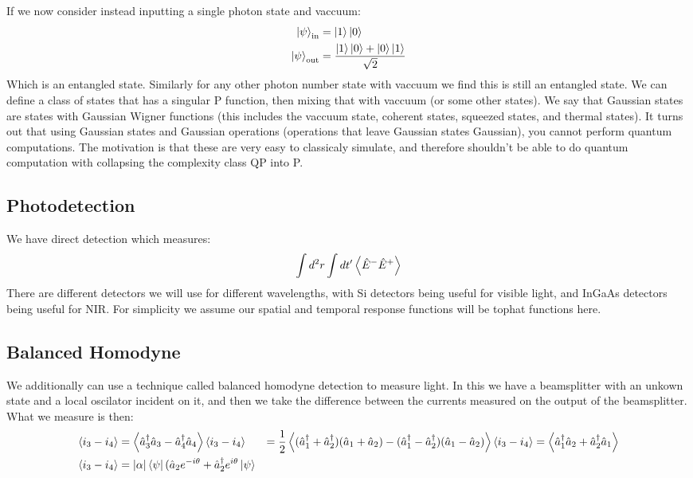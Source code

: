 If we now consider instead inputting a single photon state and vaccuum:
\begin{align*}
	\ket{\psi}_\text{in} &= \ket{1}\ket{0} \\
	\ket{\psi}_\text{out} &= \frac{\ket{1}\ket{0} + \ket{0}\ket{1}}{\sqrt{2}}
\end{align*}
Which is an entangled state. Similarly for any other photon number state with vaccuum we find this is still an entangled state.
We can define a class of states that has a singular P function, then mixing that with vaccuum (or some other states).
We say that Gaussian states are states with Gaussian Wigner functions (this includes the vaccuum state, coherent states, squeezed states, and thermal states).
It turns out that using Gaussian states and Gaussian operations (operations that leave Gaussian states Gaussian), you cannot perform quantum computations.
The motivation is that these are very easy to classicaly simulate, and therefore shouldn't be able to do quantum computation with collapsing the complexity class QP into P.

\subsection{Photodetection}
We have direct detection which measures:
\begin{align*}
	\int d^2 r \int dt' \expval{\hat{E}^-\hat{E}^+}
\end{align*}
There are different detectors we will use for different wavelengths, with Si detectors being useful for visible light, and InGaAs detectors being useful for NIR.
For simplicity we assume our spatial and temporal response functions will be tophat functions here.

\subsection{Balanced Homodyne}
We additionally can use a technique called balanced homodyne detection to measure light.
In this we have a beamsplitter with an unkown state and a local oscilator incident on it, and then we take the difference between the currents measured on the output of the beamsplitter. What we measure is then:
\begin{align*}
	\expval{i_3  - i_4} &= \expval{\hat{a}_3^\dagger\hat{a}_3 - \hat{a}_4^\dagger\hat{a}_4}
	\expval{i_3  - i_4} &= \frac{1}{2}\expval{(\hat{a}_1^\dagger +\hat{a}_2^\dagger)(\hat{a}_1 + \hat{a}_2) - (\hat{a}_1^\dagger - \hat{a}_2^\dagger)(\hat{a}_1 - \hat{a}_2)}
	\expval{i_3  - i_4} &= \expval{\hat{a}_1^\dagger\hat{a}_2 + \hat{a}_2^\dagger\hat{a}_1} \\
	\expval{i_3  - i_4} &= |\alpha| \bra{\psi}(\hat{a}_2 e^{-i\theta} + \hat{a}_2^\dagger e^{i\theta}\ket{\psi}
\end{align*}
